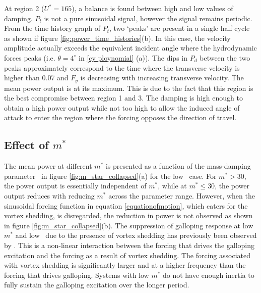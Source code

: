 At region 2 ($U^*=165$), a balance is found between high and low values of damping. $P_t$ is not a pure sinusoidal signal, however the signal remains periodic. From the time history graph of $P_t$, two `peaks' are present in a single half cycle as shown if figure \ref{fig:power_time_histories}(b). In this case, the velocity amplitude actually exceeds the equivalent incident angle where the hydrodynamic forces peaks (i.e. $\theta=4^\circ$ in \ref{cy ploynomial} (a)). The dips in $P_d$ between the two peaks approximately correspond to the time where the transverse velocity is higher than 0.07 and $F_y$ is decreasing with increasing transverse velocity. The mean power output is at its maximum. This is due to the fact that this region is the best compromise between region 1 and 3. The damping is high enough to obtain a high power output while not too high to allow the induced angle of attack to enter the region where the forcing opposes the direction of travel. 

  



\subsection{Effect of $m^*$}

 
 

The mean power at different $m^*$ is presented as a function of the mass-damping parameter \massdamp\ in figure \ref{fig:m_star_collapsed}(a) for the low \reynoldsnumber\ case. For $m^*>30$, the power output is essentially independent of $m^*$, while at $m^* \leq 30$, the power output reduces with reducing $m^*$ across the parameter range. However, when the sinusoidal forcing function in equation \ref{equationofmotion}, which caters for the vortex shedding, is disregarded, the reduction in power is not observed as shown in figure \ref{fig:m_star_collapsed}(b). The suppression of galloping response at low $m^*$ and low \reynoldsnumber\ due to the presence of vortex shedding has previously been observed by \cite{Joly2012}. This is a non-linear interaction between the forcing that drives the galloping excitation and the forcing as a result of vortex shedding. The forcing associated with vortex  shedding is significantly larger and at a higher frequency than the forcing that drives galloping. Systems with low $m^*$ do not have enough inertia to fully sustain the galloping excitation over the longer period.


